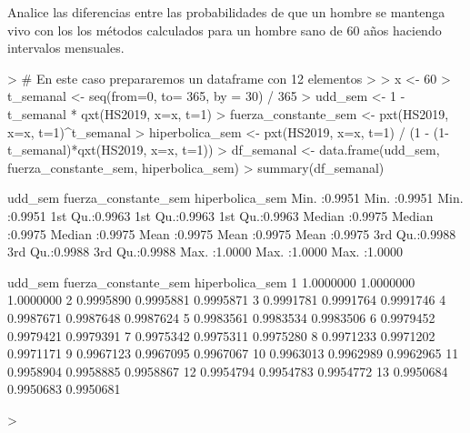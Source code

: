 \documentclass[12pt]{report}
\begin{document}
Analice las diferencias entre las probabilidades de que un hombre se mantenga vivo con los los métodos calculados para un hombre sano de 60 años haciendo intervalos mensuales.

\begin{Schunk}
\begin{Sinput}
> # En este caso prepararemos un dataframe con 12 elementos 
> 
> x <- 60
> t_semanal <- seq(from=0, to= 365, by = 30) / 365
> udd_sem <- 1 - t_semanal * qxt(HS2019, x=x, t=1)
> fuerza_constante_sem <- pxt(HS2019, x=x, t=1)^t_semanal
> hiperbolica_sem <-  pxt(HS2019, x=x, t=1) / (1 - (1-t_semanal)*qxt(HS2019, x=x, t=1))
> df_semanal <- data.frame(udd_sem, fuerza_constante_sem, hiperbolica_sem)
> summary(df_semanal)
\end{Sinput}
\begin{Soutput}
    udd_sem       fuerza_constante_sem hiperbolica_sem 
 Min.   :0.9951   Min.   :0.9951       Min.   :0.9951  
 1st Qu.:0.9963   1st Qu.:0.9963       1st Qu.:0.9963  
 Median :0.9975   Median :0.9975       Median :0.9975  
 Mean   :0.9975   Mean   :0.9975       Mean   :0.9975  
 3rd Qu.:0.9988   3rd Qu.:0.9988       3rd Qu.:0.9988  
 Max.   :1.0000   Max.   :1.0000       Max.   :1.0000  
\end{Soutput}
\begin{Soutput}
     udd_sem fuerza_constante_sem hiperbolica_sem
1  1.0000000            1.0000000       1.0000000
2  0.9995890            0.9995881       0.9995871
3  0.9991781            0.9991764       0.9991746
4  0.9987671            0.9987648       0.9987624
5  0.9983561            0.9983534       0.9983506
6  0.9979452            0.9979421       0.9979391
7  0.9975342            0.9975311       0.9975280
8  0.9971233            0.9971202       0.9971171
9  0.9967123            0.9967095       0.9967067
10 0.9963013            0.9962989       0.9962965
11 0.9958904            0.9958885       0.9958867
12 0.9954794            0.9954783       0.9954772
13 0.9950684            0.9950683       0.9950681
\end{Soutput}
\begin{Sinput}
> 
\end{Sinput}
\end{Schunk}
\end{document}
